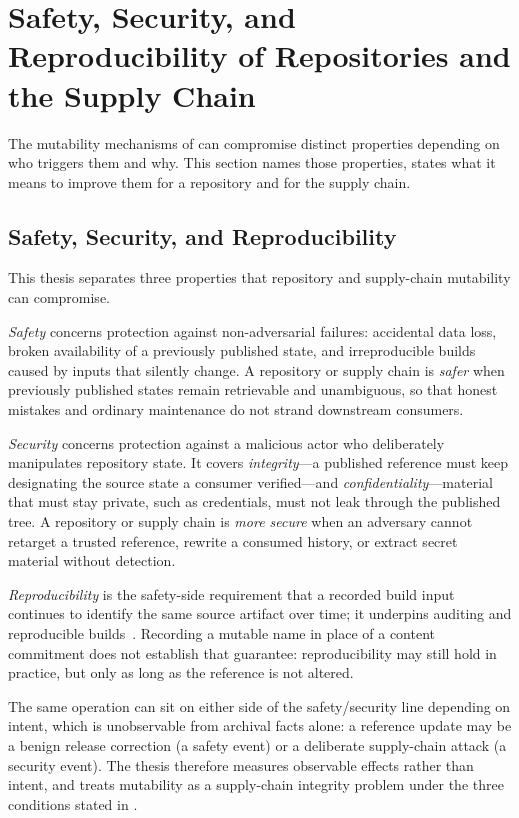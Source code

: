 \section[Safety, Security, and Reproducibility of Repositories and the SSC]{Safety, Security, and Reproducibility of Repositories and the Supply Chain}
\label{sec:bg-safety-security}

The mutability mechanisms of  can compromise distinct properties depending on who triggers them and why.
This section names those properties, states what it means to improve them for a repository and for the supply chain.

\subsection{Safety, Security, and Reproducibility}
\label{subsec:bg-triad}

This thesis separates three properties that repository and supply-chain mutability can compromise.

\emph{Safety} concerns protection against non-adversarial failures: accidental data loss, broken availability of a previously published state, and irreproducible builds caused by inputs that silently change.
A repository or supply chain is \emph{safer} when previously published states remain retrievable and unambiguous, so that honest mistakes and ordinary maintenance do not strand downstream consumers.

\emph{Security} concerns protection against a malicious actor who deliberately manipulates repository state.
It covers \emph{integrity}---a published reference must keep designating the source state a consumer verified---and \emph{confidentiality}---material that must stay private, such as credentials, must not leak through the published tree.
A repository or supply chain is \emph{more secure} when an adversary cannot retarget a trusted reference, rewrite a consumed history, or extract secret material without detection.

\emph{Reproducibility} is the safety-side requirement that a recorded build input continues to identify the same source artifact over time; it underpins auditing and reproducible builds~\cite{DBLP:journals/software/LambZ22}.
Recording a mutable name in place of a content commitment does not establish that guarantee: reproducibility may still hold in practice, but only as long as the reference is not altered.

The same operation can sit on either side of the safety/security line depending on intent, which is unobservable from archival facts alone: a reference update may be a benign release correction (a safety event) or a deliberate supply-chain attack (a security event).
The thesis therefore measures observable effects rather than intent, and treats mutability as a supply-chain integrity problem under the three conditions stated in .

